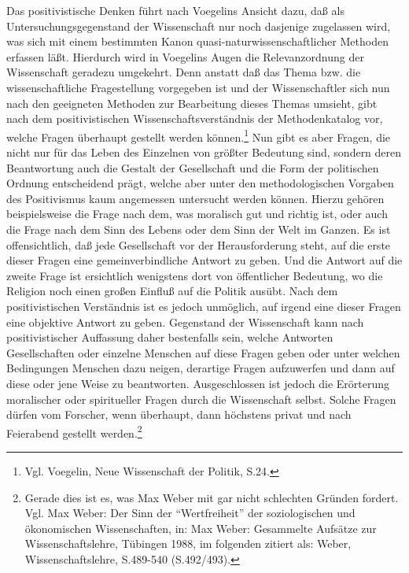 Das positivistische Denken führt nach Voegelins Ansicht dazu, daß als
Untersuchungsgegenstand der Wissenschaft nur noch dasjenige zugelassen wird,
was sich mit einem bestimmten Kanon quasi-naturwissenschaftlicher Methoden
erfassen läßt. Hierdurch wird in Voegelins Augen die Relevanzordnung der
Wissenschaft geradezu umgekehrt. Denn anstatt daß das Thema bzw. die
wissenschaftliche Fragestellung vorgegeben ist und der Wissenschaftler sich
nun nach den geeigneten Methoden zur Bearbeitung dieses Themas umsieht, gibt
nach dem positivistischen Wissenschaftsverständnis der Methodenkatalog vor,
welche Fragen überhaupt gestellt werden können.\footnote{Vgl. Voegelin, Neue
  Wissenschaft der Politik, S.24.} Nun gibt es aber Fragen, die nicht nur für
das Leben des Einzelnen von größter Bedeutung sind, sondern deren Beantwortung
auch die Gestalt der Gesellschaft und die Form der politischen Ordnung
entscheidend prägt, welche aber unter den methodologischen Vorgaben des
Positivismus kaum angemessen untersucht werden können. Hierzu gehören
beispielsweise die Frage nach dem, was moralisch gut und richtig ist, oder
auch die Frage nach dem Sinn des Lebens oder dem Sinn der Welt im Ganzen. Es
ist offensichtlich, daß jede Gesellschaft vor der Herausforderung steht, auf
die erste dieser Fragen eine gemeinverbindliche Antwort zu geben. Und die
Antwort auf die zweite Frage ist ersichtlich wenigstens dort von öffentlicher
Bedeutung, wo die Religion noch einen großen Einfluß auf die Politik ausübt.
Nach dem positivistischen Verständnis ist es jedoch unmöglich, auf irgend eine
dieser Fragen eine objektive Antwort zu geben.  Gegenstand der Wissenschaft
kann nach positivistischer Auf\/fassung daher bestenfalls sein, welche Antworten
Gesellschaften oder einzelne Menschen auf diese Fragen geben oder unter
welchen Bedingungen Menschen dazu neigen, derartige Fragen aufzuwerfen und
dann auf diese oder jene Weise zu beantworten. Ausgeschlossen ist jedoch die
Erörterung moralischer oder spiritueller Fragen durch die Wissenschaft selbst.
Solche Fragen dürfen vom Forscher, wenn überhaupt, dann höchstens privat und
nach Feierabend gestellt werden.\footnote{Gerade dies ist es, was Max Weber
  mit gar nicht schlechten Gründen fordert. Vgl. Max Weber: Der
  Sinn der "`Wertfreiheit"' der soziologischen und ökonomischen
  Wissenschaften, in: Max Weber: Gesammelte Aufsätze zur Wissenschaftslehre,
  Tübingen 1988, im folgenden zitiert als: Weber, Wissenschaftslehre,
  S.489-540 (S.492/493).}

